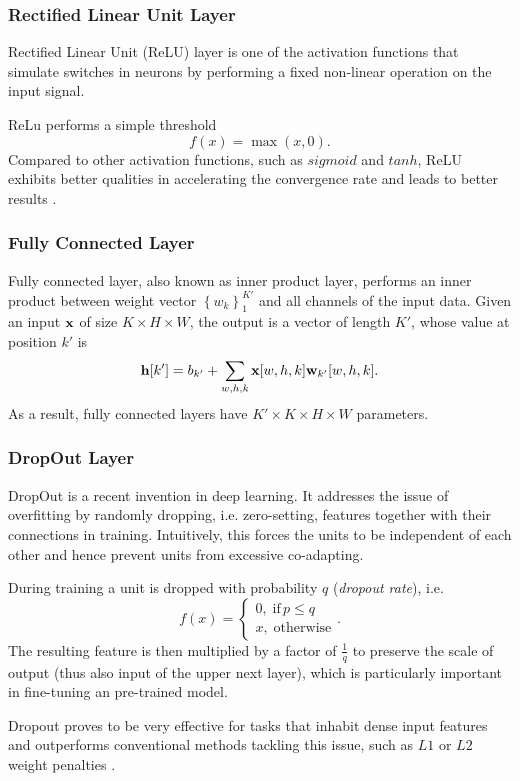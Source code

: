 \subsubsection{Rectified Linear Unit Layer}
Rectified Linear Unit (ReLU) layer is one of the activation functions that simulate switches in neurons by performing a fixed non-linear operation on the input signal.

ReLu performs a simple threshold \[ f(x) = \max(x, 0). \]
Compared to other activation functions, such as $ sigmoid $ and $ tanh $, ReLU exhibits better qualities in accelerating the convergence rate \cite{krizhevsky2012imagenet} and leads to better results \cite{maas2013rectifier}.
\subsubsection{Fully Connected Layer}
Fully connected layer, also known as inner product layer, performs an inner product between weight vector $ \left\lbrace w_k \right\rbrace_{1}^{K'} $ and all channels of the input data. Given an input $ \mathbf{x} $ of size $ K\times H\times W $, the output is a vector of length $ K' $, whose value at position $ k' $ is
\[ \mathbf{h}[k'] = b_{k'} + \sum_{w, h, k}\mathbf{x}[w,h,k]\mathbf{w}_{k'}[w,h,k]. \]
As a result, fully connected layers have $ K' \times K\times H\times W  $ parameters.
\subsubsection{DropOut Layer}
DropOut \cite{hinton2012improving} is a recent invention in deep learning. 
It addresses the issue of overfitting by randomly dropping, i.e. zero-setting, features together with their connections in training. 
Intuitively, this forces the units to be independent of each other and hence prevent units from excessive co-adapting.

During training a unit is dropped with probability $ q $ (\textit{dropout rate}), i.e.
\[ f(x) = \begin{cases}
0, \; \mathrm{if}\, p \le q \\
x, \; \mathrm{otherwise}
\end{cases}. \]
The resulting feature is then multiplied by a factor of $ \frac{1}{q} $ to preserve the scale of output (thus also input of the upper next layer), which is particularly important in fine-tuning an pre-trained model.

Dropout proves to be very effective for tasks that inhabit dense input features and outperforms conventional methods tackling this issue, such as $ L1 $ or $ L2 $ weight penalties \cite{srivastava2014dropout}.
